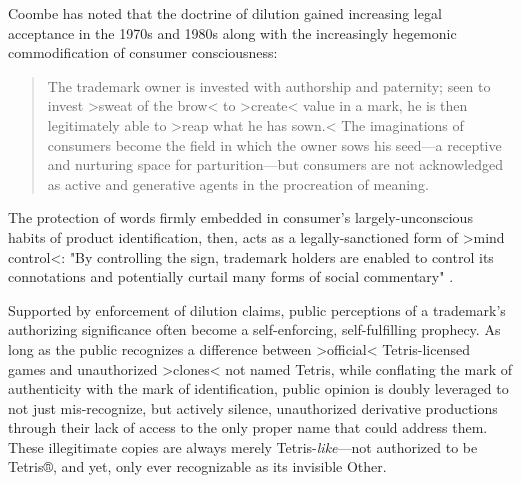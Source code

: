 Coombe has noted that the doctrine of dilution gained increasing legal acceptance in the 1970s and 1980s along with the increasingly hegemonic commodification of consumer consciousness:
\blockquote{
  The trademark owner is invested with authorship and paternity; seen to invest >sweat of the brow< to >create< value in a mark, he is then legitimately able to >reap what he has sown.< The imaginations of consumers become the field in which the owner sows his seed---a receptive and nurturing space for parturition---but consumers are not acknowledged as active and generative agents in the procreation of meaning. \autocite*[71]{Coombe1998-yv}
}
The protection of words firmly embedded in consumer's largely-unconscious habits of product identification, then, acts as a legally-sanctioned form of >mind control<: "By controlling the sign, trademark holders are enabled to control its connotations and potentially curtail many forms of social commentary" \autocite[73]{Coombe1998-yv}.

Supported by enforcement of dilution claims, public perceptions of a trademark's authorizing significance often become a self-enforcing, self-fulfilling prophecy. As long as the public recognizes a difference between >official< Tetris-licensed games and unauthorized >clones< not named Tetris, while conflating the mark of authenticity with the mark of identification, public opinion is doubly leveraged to not just mis-recognize, but actively silence, unauthorized derivative productions through their lack of access to the only proper name that could address them. These illegitimate copies are always merely Tetris-\emph{like}---not authorized to be Tetris®, and yet, only ever recognizable as its invisible Other.

